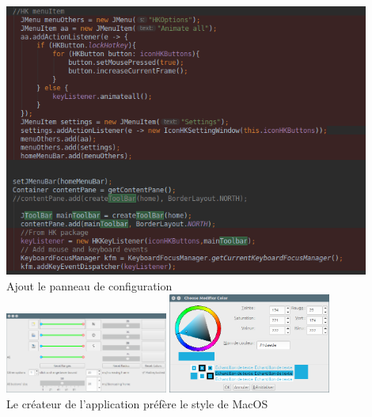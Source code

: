 \documentclass[12pt,a4paper]{article}
\begin{document}
\begin{enumerate}
\begin{center}
	\includegraphics[width=0.9\textwidth]{09.png}\\
	Ajout le panneau de configuration\\
	\includegraphics[width=0.4\textwidth]{13.png}
	\includegraphics[width=0.4\textwidth]{14.png}\\
	Le créateur de l'application préfère le style de MacOS
\end{center}
\end{enumerate}
\end{document}
